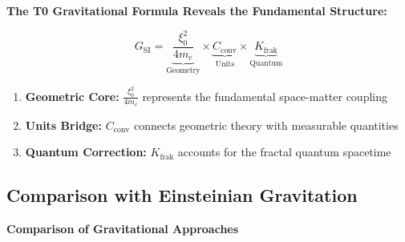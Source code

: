 	\begin{keyresult}
		\textbf{The T0 Gravitational Formula Reveals the Fundamental Structure:}
		
		\begin{equation}
			G_{\text{SI}} = \underbrace{\frac{\xi_0^2}{4 m_e}}_{\text{Geometry}} \times \underbrace{C_{\text{conv}}}_{\text{Units}} \times \underbrace{K_{\text{frak}}}_{\text{Quantum}}
		\end{equation}
		
		\begin{enumerate}
			\item \textbf{Geometric Core:} $\frac{\xi_0^2}{4 m_e}$ represents the fundamental space-matter coupling
			
			\item \textbf{Units Bridge:} $C_{\text{conv}}$ connects geometric theory with measurable quantities
			
			\item \textbf{Quantum Correction:} $K_{\text{frak}}$ accounts for the fractal quantum spacetime
		\end{enumerate}
	\end{keyresult}
	
	\subsection{Comparison with Einsteinian Gravitation}
	
	\begin{center}
		\par\vspace{0.5em}
		\textbf{Comparison of Gravitational Approaches}
	\end{center}
	

